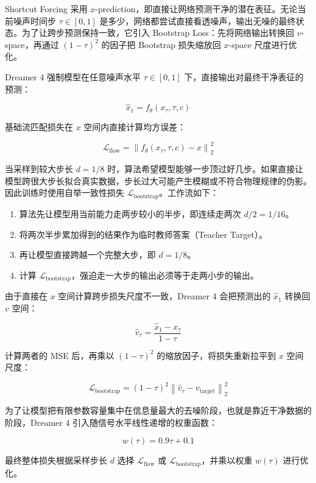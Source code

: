 Shortcut Forcing 采用 \(x\)-prediction，即直接让网络预测干净的潜在表征。无论当前噪声时间步 \(\tau\in[0,1]\) 是多少，网络都尝试直接看透噪声，输出无噪的最终状态。为了让跨步预测保持一致，它引入 Bootstrap Loss：先将网络输出转换回 \(v\)-space，再通过 \((1-\tau)^2\) 的因子把 Bootstrap 损失缩放回 \(x\)-space 尺度进行优化。

Dreamer 4 强制模型在任意噪声水平 \(\tau\in[0,1]\) 下，直接输出对最终干净表征的预测：

\[
\hat{x}_1=f_\theta(x_\tau,\tau,c)
\]

基础流匹配损失在 \(x\) 空间内直接计算均方误差：

\[
\mathcal{L}_{\mathrm{flow}}=\left\|f_\theta(x_\tau,\tau,c)-x\right\|_2^2
\]

当采样到较大步长 \(d=1/8\) 时，算法希望模型能够一步顶过好几步。如果直接让模型跨很大步长拟合真实数据，步长过大可能产生模糊或不符合物理规律的伪影。因此训练时使用自举一致性损失 \(\mathcal{L}_{\mathrm{bootstrap}}\)。工作流如下：

\begin{enumerate}
\def\labelenumi{\arabic{enumi}.}
\tightlist
\item
  算法先让模型用当前能力走两步较小的半步，即连续走两次 \(d/2=1/16\)。
\item
  将两次半步累加得到的结果作为临时教师答案（Teacher Target）。
\item
  再让模型直接跨越一个完整大步，即 \(d=1/8\)。
\item
  计算 \(\mathcal{L}_{\mathrm{bootstrap}}\)，强迫走一大步的输出必须等于走两小步的输出。
\end{enumerate}

由于直接在 \(x\) 空间计算跨步损失尺度不一致，Dreamer 4 会把预测出的 \(\hat{x}_1\) 转换回 \(v\) 空间：

\[
\hat{v}_\tau=\frac{\hat{x}_1-x_\tau}{1-\tau}
\]

计算两者的 MSE 后，再乘以 \((1-\tau)^2\) 的缩放因子，将损失重新拉平到 \(x\) 空间尺度：

\[
\mathcal{L}_{\mathrm{bootstrap}}=(1-\tau)^2\left\|\hat{v}_\tau-v_{\mathrm{target}}\right\|_2^2
\]

为了让模型把有限参数容量集中在信息量最大的去噪阶段，也就是靠近干净数据的阶段，Dreamer 4 引入随信号水平线性递增的权重函数：

\[
w(\tau)=0.9\tau+0.1
\]

最终整体损失根据采样步长 \(d\) 选择 \(\mathcal{L}_{\mathrm{flow}}\) 或 \(\mathcal{L}_{\mathrm{bootstrap}}\)，并乘以权重 \(w(\tau)\) 进行优化。

